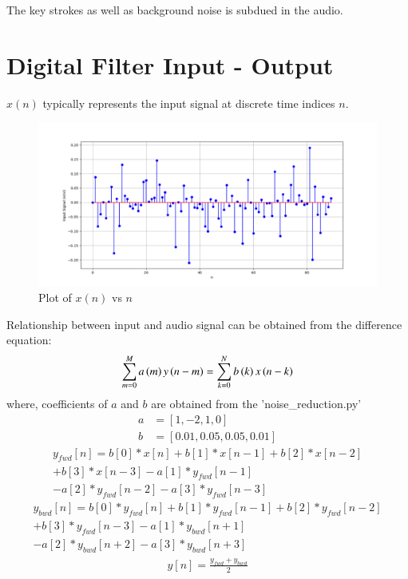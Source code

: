 \documentclass[journal,12pt,twocolumn]{IEEEtran}
\theoremstyle{remark}
\begin{document}
The key strokes as well as
background noise is subdued in the audio.
\section{Digital Filter Input - Output}
$x(n)$ typically represents the input signal at
discrete time indices \(n\).

\begin{figure}[!h] 
\centering
\includegraphics[width=\columnwidth]{figs/x(n).png}
\caption{Plot of $x(n)$  vs $n$ }
\end{figure}
Relationship between input and audio signal can be obtained from the difference equation: 
\begin{align}
     \sum _{m=0}^{M}a\left(m\right)y\left(n-m\right)=\sum _{k=0}^{N}b\left(k\right)x\left(n-k\right)
\end{align}
where, 
coefficients of $a$ and $b$ are obtained from the 'noise\_reduction.py'
\begin{align}
a &= [1, -2, 1, 0] \\
b &= [0.01, 0.05, 0.05, 0.01]
\end{align}
\begin{multline}
     y_{fwd}[n] = b[0]*x[n] + b[1]*x[n-1] + b[2]*x[n-2] \\+ b[3]*x[n-3] - a[1]*y_{fwd}[n-1] \\- a[2]*y_{fwd}[n-2] - a[3]*y_{fwd}[n-3]
\end{multline}
\begin{multline}
     y_{bwd}[n] = b[0]*y_{fwd}[n] + b[1]*y_{fwd}[n-1] + b[2]*y_{fwd}[n-2] \\+ b[3]*y_{fwd}[n-3] - a[1]*y_{bwd}[n+1]\\ - a[2]*y_{bwd}[n+2] -a[3]*y_{bwd}[n+3]
\end{multline}
\begin{align}
    y[n] = \frac{y_{fwd} + y_{bwd}}{2}\label{eq:iir_filter}
\end{align}
\end{document}
